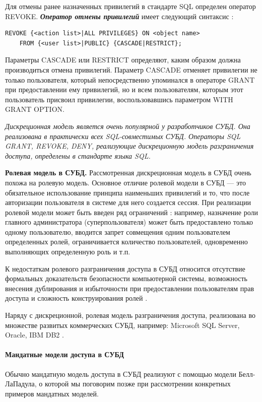 Для отмены ранее назначенных привилегий в стандарте SQL определен оператор REVOKE. \textit{\textbf{Оператор отмены
привилегий}} имеет следующий синтаксис \autocite{Skakun}:
\begin{lstlisting}[]
REVOKE {<action list>|ALL PRIVILEGES} ON <object name>
    FROM {<user list>|PUBLIC} {CASCADE|RESTRICT};
\end{lstlisting}
Параметры CASCADE или RESTRICT определяют, каким образом должна производиться отмена привилегий. Параметр
CASCADE отменяет привилегии не только пользователя, который непосредственно упоминался в операторе GRANT при
предоставлении ему привилегий, но и всем пользователям, которым этот пользователь присвоил привилегии,
воспользовавшись параметром WITH GRANT OPTION.

\textit{Дискреционная модель является очень популярной у разработчиков СУБД. Она реализована в практически всех
SQL-совместимых СУБД. Операторы SQL GRANT, REVOKE, DENY, реализующие дискреционную модель разграничения
доступа, определены в стандарте языка SQL.}

\textbf{Ролевая модель в СУБД.} Рассмотренная дискреционная модель в СУБД очень похожа на ролевую модель.
Основное отличие ролевой модели в СУБД --- это обязательное использование принципа наименьших привилегий
и то, что после авторизации пользователя в системе для него создается сессия. При реализации ролевой
модели может быть введен ряд ограничений \autocite{Skakun}: например, назначение роли главного администратора
(суперпользователя) может быть предоставлено только одному пользователю, вводится запрет совмещения одним
пользователем определенных ролей, ограничивается количество пользователей, одновременно выполняющих определенную
роль и т.п.

К недостаткам ролевого разграничения доступа в СУБД относится отсутствие формальных доказательств безопасности
компьютерной системы, возможность внесения дублирования и избыточности при предоставлении пользователям прав
доступа и сложность конструирования ролей \autocite{Skakun}.

Наряду с дискреционной, ролевая модель разграничения доступа, реализована во множестве развитых коммерческих
СУБД, например: Microsoft SQL Server, Oracle, IBM DB2 \autocite{Skakun}.

\paragraph{Мандатные модели доступа в СУБД}

Обычно мандатную модель доступа в СУБД реализуют с помощью модели Белл-ЛаПадула, о которой мы поговорим позже
при рассмотрении конкретных примеров мандатных моделей.

